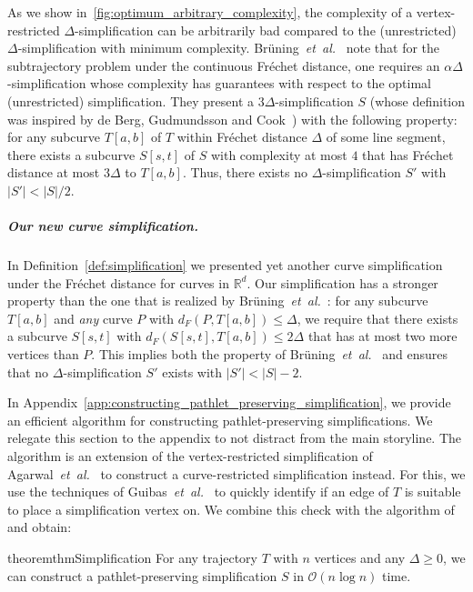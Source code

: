 \documentclass[a4paper,UKenglish,cleveref,thm-restate,notab]{lipics-v2021}
\makeatletter
\newcommand{\etal}{\textit{et~al.\@}\xspace}
\newcommand{\f}{Fr\'echet\xspace}
\newcommand{\dF}{\ensuremath{d_F}}
\newcommand{\bigO}{\mathcal{O}}
\newcommand{\R}{\mathbb{R}}
\makeatother
\begin{document}
    As we show in~\cref{fig:optimum_arbitrary_complexity}, the complexity of a vertex-restricted $\Delta$-simplification can be arbitrarily bad compared to the (unrestricted) $\Delta$-simplification with minimum complexity. 
    Br\"{u}ning~\etal~\cite{bruning_faster_2022} note that for the subtrajectory problem under the continuous \f distance, one requires an $\alpha \Delta$-simplification whose complexity has guarantees with respect to the optimal (unrestricted) simplification.
    They present a $3 \Delta$-simplification $S$ (whose definition was inspired by de Berg, Gudmundsson and Cook~\cite{de_berg_fast_2013}) with the following property:
    for any subcurve $T[a, b]$ of $T$ within \f distance $\Delta$ of some line segment, there exists a subcurve $S[s, t]$ of $S$ with complexity at most $4$ that has \f distance at most $3\Delta$ to $T[a, b]$.
    Thus, there exists no $\Delta$-simplification $S'$ with $|S'| < |S|/2$. 
        
\subparagraph*{Our new curve simplification.}
    In Definition~\ref{def:simplification} we presented yet another curve simplification under the \f distance for curves in $\R^d$.  
    Our simplification has a stronger property than the one that is realized by Br\"{u}ning~\etal~\cite{bruning_faster_2022}: 
    for any subcurve $T[a,b]$ and \emph{any} curve $P$ with $\dF(P, T[a, b]) \leq \Delta$, we require that there exists a subcurve $S[s, t]$ with $\dF(S[s, t], T[a, b]) \leq 2\Delta$ that has at most two more vertices than $P$.
    This implies both the property of Br\"{u}ning~\etal~\cite{bruning_faster_2022} and ensures that no $\Delta$-simplification $S'$ exists with $|S'| < |S| - 2$.

    In Appendix~\ref{app:constructing_pathlet_preserving_simplification}, we provide an efficient algorithm for constructing pathlet-preserving simplifications.
    We relegate this section to the appendix to not distract from the main storyline.
    The algorithm is an extension of the vertex-restricted simplification of Agarwal~\etal~\cite{agarwal_near-linear_2005} to construct a curve-restricted simplification instead.
    For this, we use the techniques of Guibas~\etal~\cite{guibas93minimum_link} to quickly identify if an edge of $T$ is suitable to place a simplification vertex on.
    We combine this check with the algorithm of~\cite{agarwal_near-linear_2005} and obtain:

    \begin{restatable}{theorem}{thmSimplification}
    \label{thm:simplification}
        For any trajectory $T$ with $n$ vertices and any $\Delta \geq 0$, we can construct a pathlet-preserving simplification $S$ in $\bigO(n \log n)$ time. 
    \end{restatable}
\end{document}
